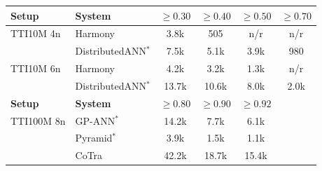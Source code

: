 \begin{table}[t]
\begin{tabular}{llcccc}
\midrule
\textbf{Setup} & \textbf{System} & $\geq 0.30$ & $\geq 0.40$ & $\geq 0.50$ & $\geq 0.70$ \\
\midrule
TTI10M 4n & Harmony & 3.8k & 505 & n/r & n/r \\
 & DistributedANN$^*$ & 7.5k & 5.1k & 3.9k & 980 \\
\addlinespace
TTI10M 6n & Harmony & 4.2k & 3.2k & 1.3k & n/r \\
 & DistributedANN$^*$ & 13.7k & 10.6k & 8.0k & 2.0k \\
\midrule
\textbf{Setup} & \textbf{System} & $\geq 0.80$ & $\geq 0.90$ & $\geq 0.92$ &  \\
\midrule
TTI100M 8n & GP-ANN$^*$ & 14.2k & 7.7k & 6.1k &  \\
 & Pyramid$^*$ & 3.9k & 1.5k & 1.1k &  \\
 & CoTra & 42.2k & 18.7k & 15.4k &  \\
\bottomrule
\end{tabular}
\end{table}
